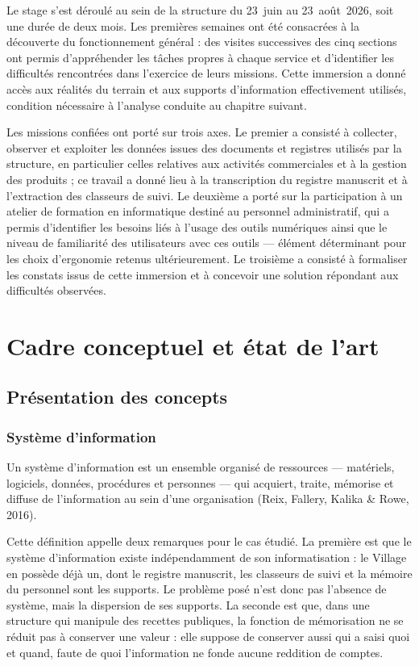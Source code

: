 Le stage s'est déroulé au sein de la structure du 23~juin au 23~août~2026, soit une durée de deux mois. Les premières semaines ont été consacrées à la découverte du fonctionnement général : des visites successives des cinq sections ont permis d'appréhender les tâches propres à chaque service et d'identifier les difficultés rencontrées dans l'exercice de leurs missions. Cette immersion a donné accès aux réalités du terrain et aux supports d'information effectivement utilisés, condition nécessaire à l'analyse conduite au chapitre suivant.

Les missions confiées ont porté sur trois axes. Le premier a consisté à collecter, observer et exploiter les données issues des documents et registres utilisés par la structure, en particulier celles relatives aux activités commerciales et à la gestion des produits ; ce travail a donné lieu à la transcription du registre manuscrit et à l'extraction des classeurs de suivi. Le deuxième a porté sur la participation à un atelier de formation en informatique destiné au personnel administratif, qui a permis d'identifier les besoins liés à l'usage des outils numériques ainsi que le niveau de familiarité des utilisateurs avec ces outils --- élément déterminant pour les choix d'ergonomie retenus ultérieurement. Le troisième a consisté à formaliser les constats issus de cette immersion et à concevoir une solution répondant aux difficultés observées.

\section{Cadre conceptuel et état de l'art}
\label{sec:1-2}

\subsection{Présentation des concepts}

\subsubsection{Système d'information}

Un système d'information est un ensemble organisé de ressources --- matériels, logiciels, données, procédures et personnes --- qui acquiert, traite, mémorise et diffuse de l'information au sein d'une organisation (Reix, Fallery, Kalika \& Rowe, 2016).

Cette définition appelle deux remarques pour le cas étudié. La première est que le système d'information existe indépendamment de son informatisation : le Village en possède déjà un, dont le registre manuscrit, les classeurs de suivi et la mémoire du personnel sont les supports. Le problème posé n'est donc pas l'absence de système, mais la dispersion de ses supports. La seconde est que, dans une structure qui manipule des recettes publiques, la fonction de mémorisation ne se réduit pas à conserver une valeur : elle suppose de conserver aussi qui a saisi quoi et quand, faute de quoi l'information ne fonde aucune reddition de comptes.

